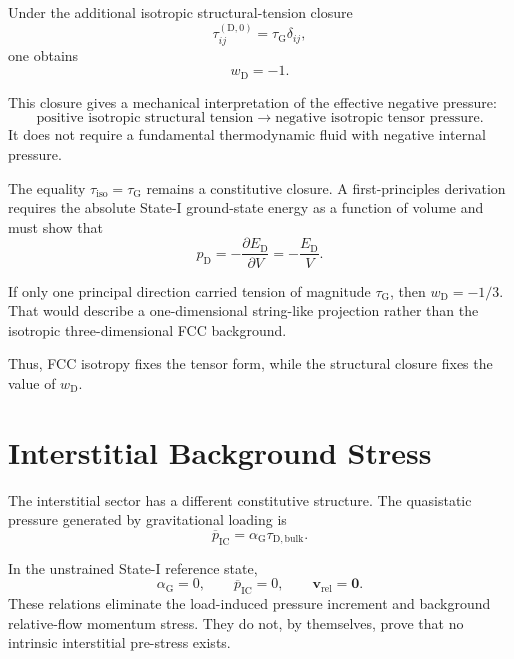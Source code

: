 Under the additional isotropic structural-tension closure
\begin{equation}
    \tau_{ij}^{(\mathrm{D},0)} = \tau_{\mathrm{G}}\delta_{ij},
\end{equation}
one obtains
\begin{equation}
    w_{\mathrm{D}}=-1.
\end{equation}

This closure gives a mechanical interpretation of the effective negative pressure:
\begin{equation}
    \text{positive isotropic structural tension} \longrightarrow \text{negative isotropic tensor pressure}.
\end{equation}
It does not require a fundamental thermodynamic fluid with negative internal pressure.

The equality $\tau_{\mathrm{iso}}=\tau_{\mathrm{G}}$ remains a constitutive closure. A first-principles derivation requires the absolute State-I ground-state energy as a function of volume and must show that
\begin{equation}
    p_{\mathrm{D}} = -\frac{\partial E_{\mathrm{D}}}{\partial V} = -\frac{E_{\mathrm{D}}}{V}.
\end{equation}

If only one principal direction carried tension of magnitude $\tau_{\mathrm{G}}$, then $w_{\mathrm{D}}=-1/3$. That would describe a one-dimensional string-like projection rather than the isotropic three-dimensional FCC background.

Thus, FCC isotropy fixes the tensor form, while the structural closure fixes the value of $w_{\mathrm{D}}$.

\section{Interstitial Background Stress}

The interstitial sector has a different constitutive structure. The quasistatic pressure generated by gravitational loading is
\begin{equation}
    \overline{p}_{\mathrm{IC}} = \alpha_{\mathrm{G}}\tau_{\mathrm{D,bulk}}.
\end{equation}

In the unstrained State-I reference state,
\begin{equation}
    \alpha_{\mathrm{G}}=0, \qquad \overline{p}_{\mathrm{IC}}=0, \qquad \mathbf{v}_{\mathrm{rel}}=\mathbf{0}.
\end{equation}
These relations eliminate the load-induced pressure increment and background relative-flow momentum stress. They do not, by themselves, prove that no intrinsic interstitial pre-stress exists.

